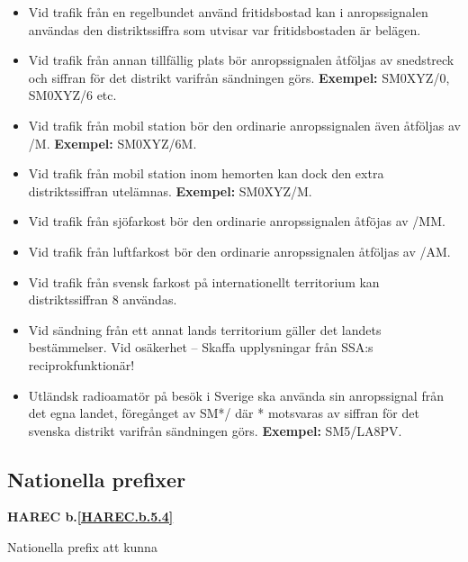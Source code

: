 \begin{itemize}

\item Vid trafik från en regelbundet använd fritidsbostad kan i
  anropssignalen användas den distriktssiffra som utvisar var
  fritidsbostaden är belägen.

\item Vid trafik från annan tillfällig plats bör anropssignalen
  åtföljas av snedstreck och siffran för det distrikt varifrån
  sändningen görs. \textbf{Exempel:} SM0XYZ/0, SM0XYZ/6 etc.

\item Vid trafik från mobil station bör den ordinarie anropssignalen
  även åtföljas av /M.  \textbf{Exempel:} SM0XYZ/6M.

\item Vid trafik från mobil station inom hemorten kan dock den extra
  distriktssiffran utelämnas.  \textbf{Exempel:} SM0XYZ/M.

\item Vid trafik från sjöfarkost bör den ordinarie anropssignalen
 åtföjas av /MM.

\item Vid trafik från luftfarkost bör den ordinarie anropssignalen
  åtföljas av /AM.

\item Vid trafik från svensk farkost på internationellt territorium
 kan distriktssiffran 8 användas.

\item Vid sändning från ett annat lands territorium gäller det landets
  bestämmelser. Vid osäkerhet -- Skaffa upplysningar från SSA:s
  reciprokfunktionär!

\item Utländsk radioamatör på besök i Sverige ska använda sin
  anropssignal från det egna landet, föregånget av SM*/ där *
  motsvaras av siffran för det svenska distrikt varifrån sändningen
  görs. \textbf{Exempel:} SM5/LA8PV.
\end{itemize}

\subsection{Nationella prefixer}
\textbf{
HAREC b.\ref{HAREC.b.5.4}\label{myHAREC.b.5.4}
}

Nationella prefix att kunna

